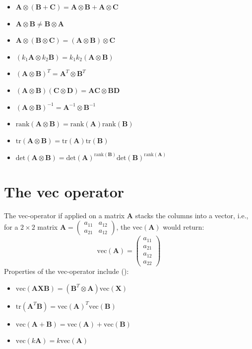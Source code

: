 \documentclass[conference,final,11pt,technote,onecolumn]{IEEEtran}\usepackage[]{graphicx}\usepackage[]{color}
\begin{document}
\begin{itemize}
\item $\mathbf{A}\otimes (\mathbf{B} + \mathbf{C}) = \mathbf{A}\otimes\mathbf{B} + \mathbf{A}\otimes \mathbf{C}$
\item $\mathbf{A}\otimes \mathbf{B} \neq \mathbf{B}\otimes \mathbf{A}$
\item $\mathbf{A}\otimes(\mathbf{B}\otimes \mathbf{C}) = (\mathbf{A}\otimes\mathbf{B})\otimes \mathbf{C}$
\item $(k_1\mathbf{A}\otimes k_2\mathbf{B}) = k_1k_2(\mathbf{A}\otimes \mathbf{B})$
\item $(\mathbf{A}\otimes\mathbf{B})^T = \mathbf{A}^T\otimes \mathbf{B}^T$
\item $(\mathbf{A}\otimes\mathbf{B})(\mathbf{C}\otimes\mathbf{D}) = \mathbf{AC}\otimes\mathbf{BD}$
\item $(\mathbf{A}\otimes\mathbf{B})^{-1} = \mathbf{A}^{-1}\otimes\mathbf{B}^{-1}$
\item $\text{rank}(\mathbf{A}\otimes\mathbf{B}) = \text{rank}(\mathbf{A})\text{rank}(\mathbf{B})$
\item $\text{tr}(\mathbf{A}\otimes\mathbf{B}) = \text{tr}(\mathbf{A})\text{tr}(\mathbf{B})$
\item $\text{det}(\mathbf{A}\otimes\mathbf{B}) = \text{det}(\mathbf{A})^{\text{rank}(\mathbf{B})}\text{det}(\mathbf{B})^{\text{rank}(\mathbf{A})}$
\end{itemize}

\section{The vec operator}
\label{term:vec_operator}
The vec-operator\cite{petersen2008matrix} if applied on a matrix $\mathbf{A}$ stacks the columns into a vector, i.e., for a $2\times 2$ matrix $\mathbf{A} = \begin{pmatrix}a_{11}&a_{12}\\a_{21}&a_{12}\end{pmatrix}$, the $\text{vec}(\mathbf{A})$ would return:
\[ \text{vec}(\mathbf{A}) = \begin{pmatrix}a_{11}\\a_{21}\\a_{12}\\a_{22}\end{pmatrix}\]
Properties of the vec-operator include (\cite{minka2000old}\cite{petersen2008matrix}):
\begin{itemize}
\item $\text{vec}(\mathbf{AXB}) = (\mathbf{B}^T\otimes \mathbf{A})\text{vec}(\mathbf{X})$
\item $\text{tr}(\mathbf{A}^T\mathbf{B}) = \text{vec}(\mathbf{A})^T\text{vec}(\mathbf{B})$
\item $\text{vec}(\mathbf{A}+\mathbf{B}) = \text{vec}(\mathbf{A}) + \text{vec}(\mathbf{B})$
\item $\text{vec}(k\mathbf{A}) = k\text{vec}(\mathbf{A})$
\end{itemize}
\end{document}
